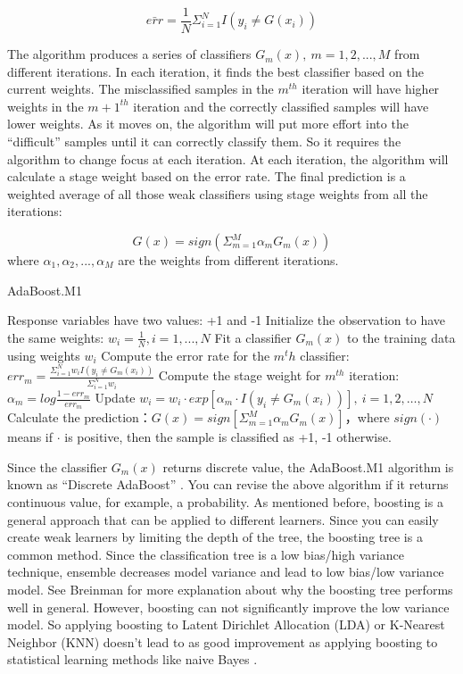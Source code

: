 \documentclass[12pt,]{krantz}
\begin{document}
\[\bar{err}=\frac{1}{N}\Sigma_{i=1}^NI(y_i\neq G(x_i))\]

The algorithm produces a series of classifiers \(G_m(x),\ m=1,2,...,M\) from different iterations. In each iteration, it finds the best classifier based on the current weights. The misclassified samples in the \(m^{th}\) iteration will have higher weights in the \(m+1^{th}\) iteration and the correctly classified samples will have lower weights. As it moves on, the algorithm will put more effort into the ``difficult'' samples until it can correctly classify them. So it requires the algorithm to change focus at each iteration. At each iteration, the algorithm will calculate a stage weight based on the error rate. The final prediction is a weighted average of all those weak classifiers using stage weights from all the iterations:

\[G(x)=sign ( \Sigma_{m=1}^M \alpha_{m}G_m(x))\]
where \(\alpha_1,\alpha_2,...,\alpha_M\) are the weights from different iterations.

\begin{algorithm}
\caption{AdaBoost.M1}\label{AdaBoostM1algorithm} 
\begin{algorithmic}[1] 
\State Response variables have two values: +1 and -1
\State Initialize the observation to have the same weights:  $w_i=\frac{1}{N},i=1,...,N$
    \State Fit a classifier $G_m(x)$ to the training data using weights $w_i$
    \State Compute the error rate for the $m^th$ classifier: $err_m=\frac{\Sigma_{i=1}^Nw_i I(y_i\neq G_m(x_i))}{\Sigma_{i=1}^Nw_i}$
    \State Compute the stage weight for $m^{th}$ iteration: $\alpha_m=log\frac{1-err_m}{err_m}$
    \State Update $w_i = w_i\cdot exp[\alpha_m\cdot I(y_i \neq G_m(x_i))],\ i=1,2,\dots,N$
\EndFor
\State Calculate the prediction：$G(x)=sign[\Sigma_{m=1}^M\alpha_mG_m(x)]$，where $sign(\cdot)$ means if $\cdot$ is positive, then the sample is classified as +1, -1 otherwise.
\end{algorithmic}
\end{algorithm}

Since the classifier \(G_m(x)\) returns discrete value, the AdaBoost.M1 algorithm is known as ``Discrete AdaBoost'' \citep{Friedman2000}. You can revise the above algorithm if it returns continuous value, for example, a probability\citep{Friedman2000}. As mentioned before, boosting is a general approach that can be applied to different learners. Since you can easily create weak learners by limiting the depth of the tree, the boosting tree is a common method. Since the classification tree is a low bias/high variance technique, ensemble decreases model variance and lead to low bias/low variance model. See Breinman\citep{Breiman1998} for more explanation about why the boosting tree performs well in general. However, boosting can not significantly improve the low variance model. So applying boosting to Latent Dirichlet Allocation (LDA) or K-Nearest Neighbor (KNN) doesn't lead to as good improvement as applying boosting to statistical learning methods like naive Bayes \citep{Bauer1999}.
\end{document}
